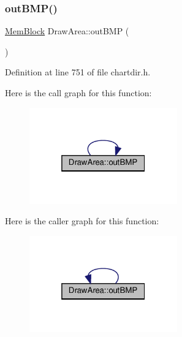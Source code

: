 \subsubsection{\texorpdfstring{out\+B\+M\+P()}{outBMP()}\hspace{0.1cm}{\footnotesize\ttfamily [3/3]}}
{\footnotesize\ttfamily \hyperlink{class_mem_block}{Mem\+Block} Draw\+Area\+::out\+B\+MP (\begin{DoxyParamCaption}{ }\end{DoxyParamCaption})\hspace{0.3cm}{\ttfamily [inline]}}



Definition at line 751 of file chartdir.\+h.

Here is the call graph for this function\+:
\nopagebreak
\begin{figure}[H]
\begin{center}
\leavevmode
\includegraphics[width=181pt]{class_draw_area_a81a003692f54e0460aeee1b14f8e080e_cgraph}
\end{center}
\end{figure}
Here is the caller graph for this function\+:
\nopagebreak
\begin{figure}[H]
\begin{center}
\leavevmode
\includegraphics[width=181pt]{class_draw_area_a81a003692f54e0460aeee1b14f8e080e_icgraph}
\end{center}
\end{figure}
\mbox{\label{class_draw_area_aa4817265f2bffb24e1544cf45abf6213}} 
